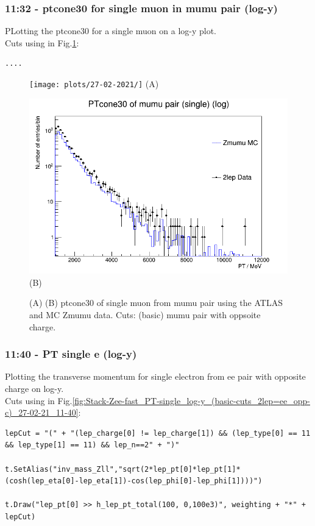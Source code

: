 \subsubsection*{11:32 - ptcone30 for single muon in mumu pair (log-y)}
PLotting the ptcone30 for a single muon on a log-y plot.
\\
Cuts using in Fig.\ref{fig:stack-Zmumu-fast_ptcone30-single_log-y_(basics_2lep=mumu-opp-c)_27-02-21_11-30}:
\begin{lstlisting}
....
\end{lstlisting}
\begin{figure}[h!]
    \centering
    \begin{minipage}{0.5\textwidth}
        \centering
        \texttt{[image: plots/27-02-2021/]}
        (A)
    \end{minipage}\hfill
    \begin{minipage}{0.5\textwidth}
        \centering
        \includegraphics[width=\linewidth]{plots/27-02-2021/2-stack-Zmumu-fast_ptcone30-single_log-y_(basics_2lep=mumu-opp-c)_27-02-21_11-30.png}
        (B)
    \end{minipage}
    \caption{(A)  (B) ptcone30 of single muon from mumu pair using the ATLAS and MC Zmumu data. Cuts: (basic) mumu pair with oppsoite charge. }
    \label{fig:stack-Zmumu-fast_ptcone30-single_log-y_(basics_2lep=mumu-opp-c)_27-02-21_11-30}
\end{figure}

\subsubsection*{11:40 - PT single e (log-y)}
Plotting the transverse momentum for single electron from ee pair with opposite charge on log-y.
\\
Cuts using in Fig.\ref{fig:Stack-Zee-fast_PT-single_log-y_(basic-cuts_2lep=ee_opp-c)_27-02-21_11-40}:
\begin{lstlisting}
lepCut = "(" + "(lep_charge[0] != lep_charge[1]) && (lep_type[0] == 11 && lep_type[1] == 11) && lep_n==2" + ")"

t.SetAlias("inv_mass_Zll","sqrt(2*lep_pt[0]*lep_pt[1]*(cosh(lep_eta[0]-lep_eta[1])-cos(lep_phi[0]-lep_phi[1])))")

t.Draw("lep_pt[0] >> h_lep_pt_total(100, 0,100e3)", weighting + "*" + lepCut)
\end{lstlisting}

